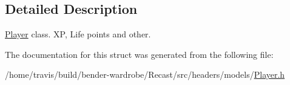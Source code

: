 \subsection{Detailed Description}
\hyperlink{struct_player}{Player} class. X\-P, Life points and other. 

The documentation for this struct was generated from the following file\-:\begin{DoxyCompactItemize}
\item 
/home/travis/build/bender-\/wardrobe/\-Recast/src/headers/models/\hyperlink{_player_8h}{Player.\-h}\end{DoxyCompactItemize}
